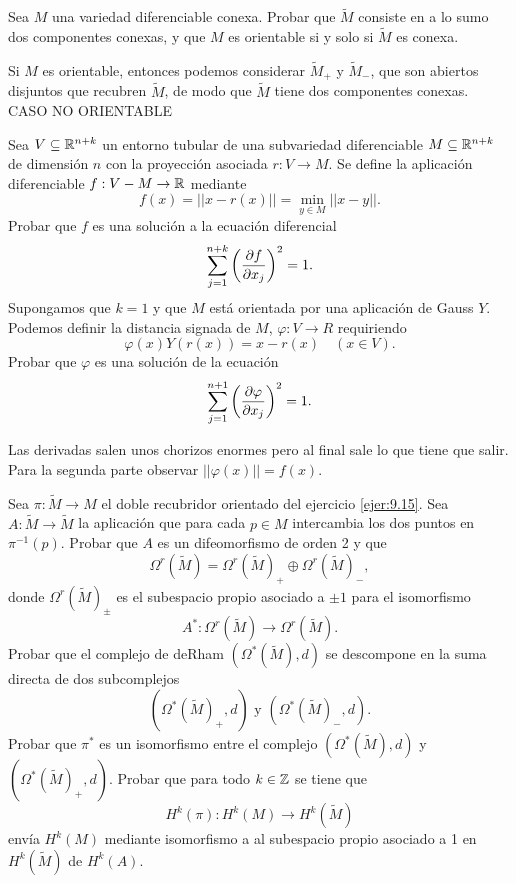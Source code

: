 \documentclass[twoside]{article}
\begin{document}
\begin{ejercicio}{9.16}
Sea $M$ una variedad diferenciable conexa. Probar que $\widetilde{M}$ consiste en a lo sumo dos componentes conexas, y que $M$ es orientable si y solo si $\widetilde{M}$ es conexa.
\end{ejercicio}
\begin{solucion}
Si $M$ es orientable, entonces podemos considerar $\widetilde{M}_+$ y $\widetilde{M}_-$, que son abiertos disjuntos que recubren $\widetilde{M}$, de modo que $\widetilde{M}$ tiene dos componentes conexas.
CASO NO ORIENTABLE
\end{solucion}
\newpage

\begin{ejercicio}{9.17}
Sea $V\subseteq\mathbb{R}^{n+k}$ un entorno tubular de una subvariedad diferenciable $M\subseteq\mathbb{R}^{n+k}$ de dimensión $n$ con la proyección asociada $r:V\to M$. Se define la aplicación diferenciable $f:V-M\to\mathbb{R}$ mediante
\[
f(x)=||x-r(x)||=\min_{y\in M}||x-y||.
\]
Probar que $f$ es una solución a la ecuación diferencial 
\[
\sum_{j=1}^{n+k}\left(\frac{\partial f}{\partial x_j}\right)^2=1.
\]
Supongamos que $k=1$ y que $M$ está orientada por una aplicación de Gauss $Y$. Podemos definir la distancia signada de $M$, $\varphi:V\to R$ requiriendo
\[
\varphi(x)Y(r(x))=x-r(x)\quad (x\in V).
\]
Probar que $\varphi$ es una solución de la ecuación 
\[
\sum_{j=1}^{n+1}\left(\frac{\partial \varphi}{\partial x_j}\right)^2=1.
\]
\end{ejercicio}
\begin{solucion}
Las derivadas salen unos chorizos enormes pero al final sale lo que tiene que salir. Para la segunda parte observar $||\varphi(x)||=f(x)$. 
\end{solucion}
\newpage

\begin{ejercicio}{9.18}
Sea $\pi:\widetilde{M}\to M$ el doble recubridor orientado del ejercicio \ref{ejer:9.15}. Sea $A:\widetilde{M}\to \widetilde{M}$ la aplicación que para cada $p\in M$ intercambia los dos puntos en $\pi^{-1}(p)$. Probar que $A$ es un difeomorfismo de orden 2 y que
\[
\Omega^r(\widetilde{M})=\Omega^r(\widetilde{M})_+\oplus\Omega^r(\widetilde{M})_-,
\]
donde $\Omega^r(\widetilde{M})_\pm$ es el subespacio propio asociado a $\pm 1$ para el isomorfismo
\[
A^*:\Omega^r(\widetilde{M})\to \Omega^r(\widetilde{M}).
\]
Probar que el complejo de deRham $(\Omega^*(\widetilde{M}),d)$ se descompone en la suma directa de dos subcomplejos
\[
(\Omega^*(\widetilde{M})_+,d)\text{ y } (\Omega^*(\widetilde{M})_-,d).
\]
Probar que $\pi^*$ es un isomorfismo entre el complejo $(\Omega^*(\widetilde{M}),d)$ y $(\Omega^*(\widetilde{M})_+,d)$. Probar que para todo $k\in\mathbb{Z}$ se tiene que
\[
H^k(\pi):H^k(M)\to H^k(\widetilde{M})
\]
envía $H^k(M)$ mediante isomorfismo a al subespacio propio asociado a 1 en $H^k(\widetilde{M})$ de $H^k(A)$. 
\end{ejercicio}
\begin{solucion}
\end{solucion}
\end{document}
